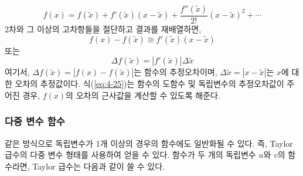 \begin{equation}
f(x)=f(\tilde{x})+f'(\tilde{x})(x-\tilde{x})+\frac{f''(\tilde{x})}{2!}(x-\tilde{x})^2+ \cdots
\end{equation}
2차와 그 이상의 고차항들을 절단하고 결과를 재배열하면,
\begin{equation}
f(x)-f(\tilde{x})\cong f'(\tilde{x})(x-\tilde{x})
\end{equation}
또는
\begin{equation}
\Delta f(\tilde{x})=\left|f'(\tilde{x})\right| \Delta \tilde{x}
\label{eq:4-25}
\end{equation}
여기서, $\Delta f(\tilde{x})=\left|f(x)-f(\tilde{x})\right|$는 함수의 추정오차이며, $\Delta \tilde{x}=\left|x-\tilde{x}\right|$는 $x$에 대한 오차의 추정값이다. 식(\ref{eq:4-25})는 함수의 도함수 및 독립변수의 추정오차값이 주어진 경우, $f(x)$의 오차의 근사값을 계산할 수 있도록 해준다.

\subsubsection{다중 변수 함수}
같은 방식으로 독립변수가 1개 이상의 경우의 함수에도 일반화될 수 있다. 즉, Taylor급수의 다중 변수 형태를 사용하여 얻을 수 있다. 함수가 두 개의 독립변수 $u$와 $v$의 함수라면, Taylor 급수는 다음과 같이 쓸 수 있다.

